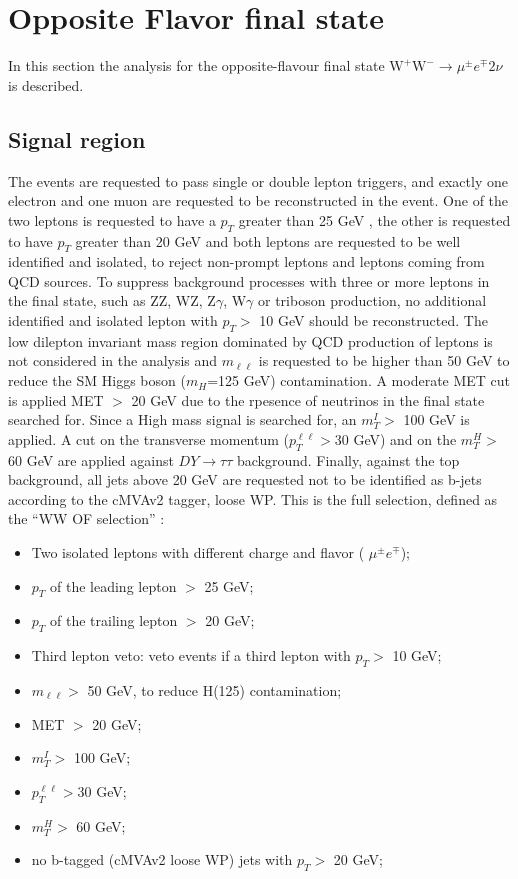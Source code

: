 \newpage
\section{Opposite Flavor final state}\label{sec:OF}
In this section the analysis for the opposite-flavour final state
$\mathrm{W^+W^-}\to \mu^{\pm} e^{\mp}  2\nu$ is described. \\

\subsection*{Signal region}

The events are requested to pass single or double lepton triggers, and exactly one electron and
one muon are requested to be reconstructed in the event. 
One of the two leptons is requested to have a $p_T$ greater than 25 GeV , the other is
requested to have  $p_T$ greater than 20 GeV and both leptons are requested to be well identified
and isolated, to reject non-prompt leptons and leptons coming from QCD sources. To suppress
background processes with three or more leptons in the final state, such as ZZ, WZ, Z$\gamma$, W$\gamma$
or triboson production, no additional identified and isolated lepton with $p_T >$  10 GeV should
be reconstructed. The low dilepton invariant mass region dominated by QCD production of
leptons is not considered in the analysis and $m_{\ell \ell}$  is requested to
be higher than 50 GeV to reduce the SM Higgs boson ($m_H$=125 GeV)
contamination. A moderate MET cut is applied MET $>$ 20 GeV due to the
rpesence of neutrinos in the final state searched for. Since a High mass
signal is searched for, an $m_T^I >$ 100 GeV is applied.
A cut on the transverse momentum ($p_T^{\ell \ell} >$30 GeV) and on the $m_T^H
>$ 60 GeV are applied against $DY\rightarrow{}\tau\tau$ background. 
Finally, against the top background, all jets above 20 GeV are requested not
to be identified as b-jets according to the cMVAv2 tagger, loose WP.
This is the full selection, defined as the ``WW OF selection'' :

\begin{itemize}
\item Two isolated leptons with different charge and flavor ( $\mu^{\pm}
e^{\mp}$);
\item $p_T$ of the leading lepton $>$ 25 GeV;
\item $p_T$ of the trailing lepton $>$ 20 GeV;
\item Third lepton veto: veto events if a third lepton with $p_T  >$ 10 GeV;
\item  $m_{\ell \ell} >$ 50 GeV, to reduce H(125) contamination;
\item MET $>$ 20 GeV;
\item $m_T^I >$ 100 GeV;
\item $p_T^{\ell \ell} >$30 GeV;
\item  $m_T^H >$ 60 GeV;
\item  no b-tagged (cMVAv2 loose WP) jets with $p_T >$  20 GeV;
\end{itemize}


